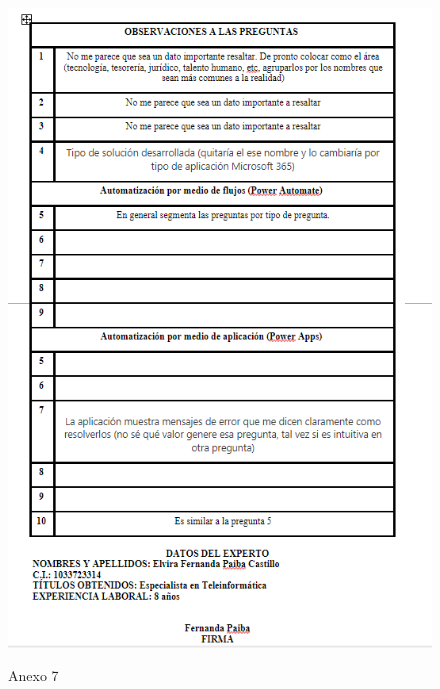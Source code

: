 \begin{figure}[H]
	\centering
	\includegraphics[scale=0.4]{Capitulo6/7}
	\label{anexo7}
	\caption{Anexo 7}
\end{figure}

